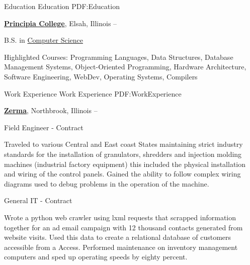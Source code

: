 \documentclass[a4paper,MMMyyyy,nonstopmode]{simpleresumecv}
\newcommand{\CVAuthor}{Bjørn Mathisen}
\newcommand{\CVWebpage}{https://bjornmathisen.com}
\begin{document}

\Title{\CVAuthor}

\begin{SubTitle}
\href{https://goo.gl/maps/gpk9cV4DUPH9WCLn6} %
{1511 Laurel, St Paul, Minnesota, 55104}
\par
\href{mailto:contact@bjornmathisen.com}
{contact@bjornmathisen.com}
\,\SubBulletSymbol\,
+1\,(224)\,622-8543
\,\SubBulletSymbol\,
\href{\CVWebpage}
{\url{Bjørn Mathisen}
\end{SubTitle}

\begin{Body}


\Section
{Education}
{Education}
{PDF:Education}

\Entry
\href{http://www.principiacollege.edu/}
{\textbf{Principia College}},
Elsah, Illinois
\hfill
{} --

\Gap
\BulletItem
B.S. in
\href{http://www.principiacollege.edu/computer-science}
{Computer Science}
\begin{Detail}
\SubBulletItem
Highlighted Courses: Programming Languages, Data Structures, Database Management Systems, Object-Oriented Programming, Hardware Architecture, Software Engineering, WebDev, Operating Systems, Compilers\end{Detail}


\Section
{Work\newline
Experience}
{Work Experience}
{PDF:WorkExperience}

\Entry
\href{https://zerma.com/en}
{\textbf{Zerma}},
Northbrook, Illinois
\hfill {} --

\Gap
\BulletItem
Field Engineer - Contract

\begin{Detail}
\SubBulletItem
Traveled to various Central and East coast States maintaining strict industry standards for the installation of granulators, shredders and injection molding machines (industrial factory equipment) this included the physical installation and wiring of the control panels. 
\SubBulletItem
Gained the ability to follow complex wiring diagrams used to debug problems in the operation of the machine. 
\end{Detail}
\Gap
\BulletItem
General IT - Contract
\begin{Detail}
\SubBulletItem
Wrote a python web crawler using lxml requests that scrapped information together for an ad email campaign with 12 thousand contacts generated from website visits. Used this data to create a relational database of customers accessible from a Access.  Performed maintenance on inventory management computers and sped up operating speeds by eighty percent.
\Gap
\end{Detail}


\end{Body}
\end{document}
